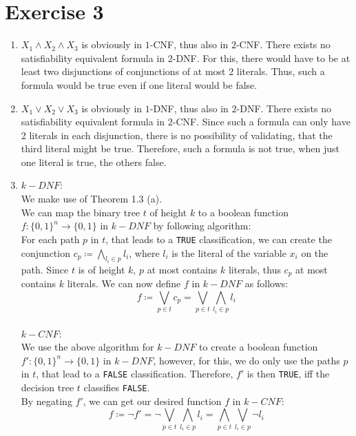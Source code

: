 \documentclass[12pt]{article}
\begin{document}
\pagebreak
\section*{Exercise 3}
\begin{enumerate}[label=(\alph*)]
	\item	$X_1 \land X_2 \land X_3$ is obviously in $1$-CNF, thus also in $2$-CNF. There exists no satisfiability equivalent formula in $2$-DNF. For this, there would have to be at least two disjunctions of conjunctions of at most 2 literals. Thus, such a formula would be true even if one literal would be false.
	\item	$X_1 \lor X_2 \lor X_3$ is obviously in $1$-DNF, thus also in $2$-DNF. There exists no satisfiability equivalent formula in $2$-CNF. Since such a formula can only have 2 literals in each disjunction, there is no possibility of validating, that the third literal might be true. Therefore, such a formula is not true, when just one literal is true, the others false.
	\item	$k-DNF$:\\
			We make use of Theorem 1.3 (a). \\
			We can map the binary tree $t$ of height $k$ to a boolean function $f: \{0,1\}^n \rightarrow \{0,1\}$ in $k-DNF$ by following algorithm: \\
			For each path $p$ in $t$, that leads to a \verb|TRUE| classification, we can create the conjunction $c_p \coloneqq \bigwedge_{l_i \in p} l_i$, where $l_i$ is the literal of the variable $x_i$ on the path. Since $t$ is of height $k$, $p$ at most contains $k$ literals, thus $c_p$ at most contains $k$ literals. We can now define $f$ in $k-DNF$ as follows:
			\[f \coloneqq \bigvee_{p \in t} c_p = \bigvee_{p \in t} \bigwedge_{l_i \in p} l_i\]\\
			$k-CNF$:\\
			We use the above algorithm for $k-DNF$ to create a boolean function $f': \{0,1\}^n \rightarrow \{0,1\}$ in $k-DNF$, however, for this, we do only use the paths $p$ in $t$, that lead to a \verb|FALSE| classification. Therefore, $f'$ is then \verb|TRUE|, iff the decision tree $t$ classifies \verb|FALSE|.\\
			By negating $f'$, we can get our desired function $f$ in $k-CNF$:
			\[f \coloneqq \neg f' = \neg \bigvee_{p \in t} \bigwedge_{l_i \in p} l_i = \bigwedge_{p \in t} \bigvee_{l_i \in p} \neg l_i\]
\end{enumerate}
\end{document}
